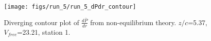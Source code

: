 \begin{figure}[H]
\centering
\texttt{[image: figs/run\_5/run\_5\_dPdr\_contour]}
\caption{Diverging contour plot of $\frac{d\bar{P}}{dr}$ from non-equilibrium theory. $z/c$=5.37, $V_{free}$=23.21, station 1.}
\label{fig:run_5_dPdr_contour}
\end{figure}



